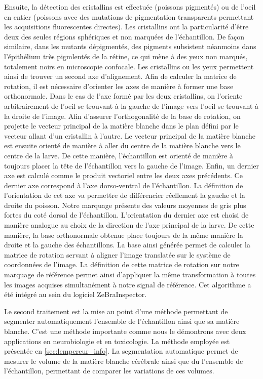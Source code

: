 \documentclass[\main/main.tex]{subfiles}
\begin{document}
%
Ensuite, la détection des cristallins est effectuée (poissons pigmentés) ou de l'oeil en entier (poissons avec des mutations de pigmentation transparents permettant les acquisitions fluorescentes directes).
%
Les cristallins ont la particularité d'être deux des seules régions sphériques et non marquées de l'échantillon.
De façon similaire, dans les mutants dépigmentés, des pigments subsistent néanmoins dans l'épithélium très pigmlentés de la rétine, ce qui mène à des yeux non marqués, totalement noirs en microscopie confocale.
%
Les cristallins ou les yeux permettent ainsi de trouver un second axe d'alignement.
%
Afin de calculer la matrice de rotation, il est nécessaire d'orienter les axes de manière à former une base orthonormale.
%
Dans le cas de l'axe formé par les deux cristallins, on l'oriente arbitrairement de l'oeil se trouvant à la gauche de l'image vers l'oeil se trouvant à la droite de l'image.
%
Afin d'assurer l'orthogonalité de la base de rotation, on projette le vecteur principal de la matière blanche dans le plan défini par le vecteur allant d'un cristallin à l'autre.
%
Le vecteur principal de la matière blanche est ensuite orienté de manière à aller du centre de la matière blanche vers le centre de la larve.
%
De cette manière, l'échantillon est orienté de manière à toujours placer la tête de l'échantillon vers la gauche de l'image.
%
Enfin, un dernier axe est calculé comme le produit vectoriel entre les deux axes précédents.
%
Ce dernier axe correspond à l'axe dorso-ventral de l'échantillon.
%
La définition de l'orientation de cet axe va permettre de différencier réellement la gauche et la droite du poisson.
%
Notre marquage présente des valeurs moyennes de gris  plus fortes du coté dorsal
de l'échantillon.
%
L'orientation du dernier axe est choisi de manière analogue
au choix de la direction de l'axe principal de la larve.
%
De cette manière, la base orthonormale obtenue place toujours de la même manière la droite et la gauche des échantillons.
%
La base ainsi générée permet de calculer la matrice de rotation servant à aligner l'image translatée sur le système de coordonnées de l'image.
%
La définition de cette matrice de rotation sur notre marquage de référence permet ainsi d'appliquer la même transformation à toutes les images acquises simultanément à notre signal de référence. Cet algorithme a été intégré au sein du logiciel ZeBraInspector.

Le second traitement est la mise au point d'une méthode permettant de segmenter automatiquement
l'ensemble de l'échantillon ainsi que sa matière blanche. C'est une méthode importante comme nous le démontrons avec deux applications en neurobiologie  et en toxicologie. 
% 
La méthode employée est présentée en \autoref{sec:lempereur_info}.
%
La segmentation automatique permet de mesurer le volume de la matière blanche cérébrale
ainsi que du l'ensemble de l'échantillon, permettant de comparer les variations de ces
volumes.
\end{document}
